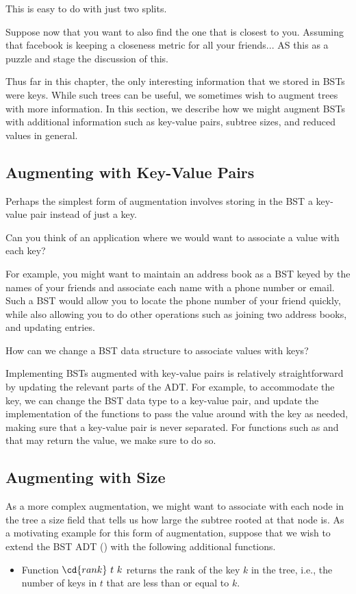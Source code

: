 \begin{chapter}
\begin{notesonly}
This is easy to do with just two splits.  

Suppose now that you want to also find the one that is closest to
you.  Assuming that facebook is keeping a closeness metric for all
your friends... AS this as a puzzle and stage the discussion of this.




\end{notesonly}

Thus far in this chapter, the only interesting information that we
stored in BSTs were keys. While such trees can be useful, we
sometimes wish to augment trees with more information. 
%
In this section, we describe how we might augment BSTs with
additional information such as key-value pairs, subtree sizes, and
reduced values in general.


\subsection{Augmenting with Key-Value Pairs}
Perhaps the simplest form of augmentation involves storing in the BST
a key-value pair instead of just a key.
%
\begin{notesonly}
\begin{question}
Can you think of an application where we would want to associate a
value with each key?
\end{question}
For example, you might want to maintain an address book as a BST keyed
by the names of your friends and associate each name with a phone
number or email.  Such a BST would allow you to locate the phone
number of your friend quickly, while also allowing you to do other
operations such as joining two address books, and updating entries.
\end{notesonly}
%
\begin{question}
How can we change a BST data structure to associate values with keys?
\end{question}
%
Implementing BSTs augmented with key-value pairs is relatively
straightforward by updating the relevant parts of the ADT.
%
For example, to accommodate the key, we can change the BST data type
to a key-value pair, and update the implementation of the functions to
pass the value around with the key as needed, making sure that a
key-value pair is never separated.  For functions such as 
and  that may return the value, we make sure to do so.

\subsection{Augmenting with Size}
As a more complex augmentation, we might want to associate with each
node in the tree a size field that tells us how large the subtree
rooted at that node is.
%
As a motivating example for this form of augmentation, suppose that we
wish to extend the BST ADT () with the following
additional functions.
%
\begin{itemize}
\item Function $\cd{rank}~t~k$ returns the rank of the key $k$ in
  the tree, i.e., the number of keys in $t$ that are less than or
  equal to $k$.


\end{itemize}
\end{chapter}
